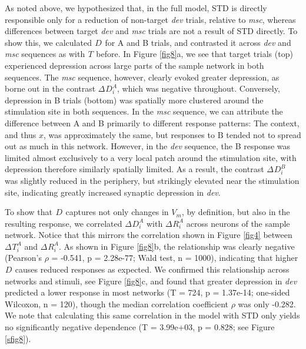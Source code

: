 \documentclass[pdflatex,referee,iicol,sn-basic]{sn-jnl}
\newcommand{\dev}{\textit{dev}}
\newcommand{\msc}{\textit{msc}}
\renewcommand{\R}[3][]{{}^{#1}_{}\!R^{#2}_{#3}}
\renewcommand{\T}[3][]{{}^{#1}_{}T^{#2}_{#3}}
\newcommand{\D}[3][]{{}^{#1}_{}\!D^{#2}_{#3}}
\theoremstyle{thmstyleone}%
\theoremstyle{thmstyletwo}%
\theoremstyle{thmstylethree}%
\begin{document}
As noted above, we hypothesized that, in the full model, STD is directly responsible only for a reduction of non-target \dev{} trials, relative to \msc{}, whereas differences between target \dev{} and \msc{} trials are not a result of STD directly. To show this, we calculated $\D{}{}$ for A and B trials, and contrasted it across \dev{} and \msc{} sequences as with $\T{}{}$ before.
In Figure \ref{fig8}a, we see that target trials (top) experienced depression across large parts of the sample network in both sequences. The \msc{} sequence, however, clearly evoked greater depression, as borne out in the contrast $\Delta \D{A}{i}$, which was negative throughout. Conversely, depression in B trials (bottom) was spatially more clustered around the stimulation site in both sequences. In the \msc{} sequence, we can attribute the difference between A and B primarily to different response patterns: The context, and thus $x$, was approximately the same, but responses to B tended not to spread out as much in this network. However, in the \dev{} sequence, the B response was limited almost exclusively to a very local patch around the stimulation site, with depression therefore similarly spatially limited. As a result, the contrast $\Delta \D{B}{i}$ was slightly reduced in the periphery, but strikingly elevated near the stimulation site, indicating greatly increased synaptic depression in \dev{}.

To show that $\D{}{}$ captures not only changes in $V_m$, by definition, but also in the resulting response, we correlated $\Delta \D{A}{i}$ with $\Delta \R{A}{i}$ across neurons of the sample network. Notice that this mirrors the correlation shown in Figure \ref{fig4} between $\Delta \T{A}{i}$ and $\Delta \R{A}{i}$. As shown in Figure \ref{fig8}b, the relationship was clearly negative (Pearson's $\rho$ = -0.541, p = 2.28e-77; Wald test, n = 1000), indicating that higher $\D{}{}$ causes reduced responses as expected. We confirmed this relationship across networks and stimuli, see Figure \ref{fig8}c, and found that greater depression in \dev{} predicted a lower response in most networks (T = 724, p = 1.37e-14; one-sided Wilcoxon, n = 120), though the median correlation coefficient $\rho$ was only -0.282. We note that calculating this same correlation in the model with STD only yields no significantly negative dependence (T = 3.99e+03, p = 0.828; see Figure \ref{sfig8}).
\end{document}
